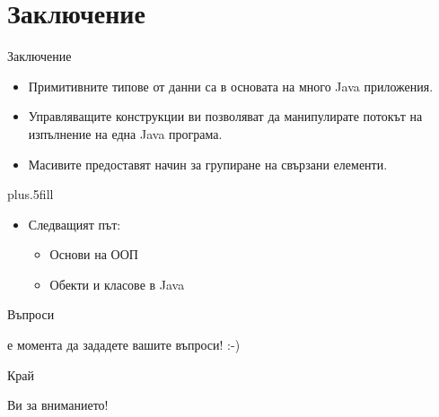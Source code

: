 \documentclass{beamer}
\begin{document}
\section*{Заключение}

\begin{frame}{Заключение}
  \transdissolve
  \begin{itemize}
  \item
    Примитивните типове от данни са в основата на много Java приложения.
  \item
    Управляващите конструкции ви позволяват да манипулирате потокът на
    изпълнение на една Java програма.
  \item
    Масивите предоставят начин за групиране на свързани елементи.
  \end{itemize}
  
  \vskip0pt plus.5fill
  \begin{itemize}
  \item
    Следващият път:
    \begin{itemize}
    \item
      Основи на ООП
    \item
      Обекти и класове в Java
    \end{itemize}
  \end{itemize}
\end{frame}


\begin{frame}{Въпроси}
  \transdissolve
  \begin{center}
     е момента да зададете вашите въпроси! :-)
  \end{center}
\end{frame}


\begin{frame}{Край}
  \transdissolve
  \begin{center}
     Ви за вниманието!
  \end{center}
  
\end{frame}
\end{document}
